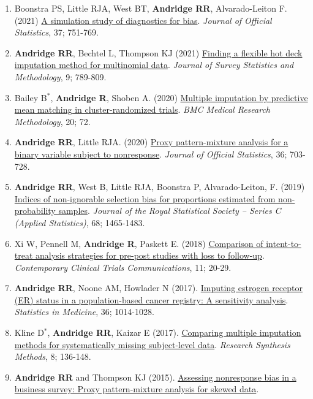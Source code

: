 \documentclass[
  english,
  letterpaper,
  DIV=11,
  numbers=noendperiod]{scrartcl}
\begin{document}
\begin{enumerate}
{  Applied Statistics}, 15; 1556-1581.
\item
  Boonstra PS, Little RJA, West BT, \textbf{Andridge RR},
  Alvarado-Leiton F. (2021)
  \href{https://doi.org/10.2478/jos-2021-0033}{A simulation study of
  diagnostics for bias}. \emph{Journal of Official Statistics}, 37;
  751-769.
\item
  \textbf{Andridge RR}, Bechtel L, Thompson KJ (2021)
  \href{https://doi.org/10.1093/jssam/smaa005}{Finding a flexible hot
  deck imputation method for multinomial data}. \emph{Journal of Survey
  Statistics and Methodology}, 9; 789-809.
\item
  Bailey B\(^*\), \textbf{Andridge R}, Shoben A. (2020)
  \href{https://doi.org/10.1186/s12874-020-00948-6}{Multiple imputation
  by predictive mean matching in cluster-randomized trials}. \emph{BMC
  Medical Research Methodology}, 20; 72.
\item
  \textbf{Andridge RR}, Little RJA. (2020)
  \href{https://doi.org/10.2478/jos-2020-0035}{Proxy pattern-mixture
  analysis for a binary variable subject to nonresponse}. \emph{Journal
  of Official Statistics}, 36; 703-728.
\item
  \textbf{Andridge RR}, West B, Little RJA, Boonstra P, Alvarado-Leiton,
  F. (2019) \href{https://doi.org/10.1111/rssc.12371}{Indices of
  non-ignorable selection bias for proportions estimated from
  non-probability samples}. \emph{Journal of the Royal Statistical
  Society -- Series C (Applied Statistics)}, 68; 1465-1483.
\item
  Xi W, Pennell M, \textbf{Andridge R}, Paskett E. (2018)
  \href{https://doi.org/10.1016/j.conctc.2018.05.008}{Comparison of
  intent-to-treat analysis strategies for pre-post studies with loss to
  follow-up}. \emph{Contemporary Clinical Trials Communications}, 11;
  20-29.
\item
  \textbf{Andridge RR}, Noone AM, Howlader N (2017).
  \href{https://doi.org/10.1002/sim.7193}{Imputing estrogen receptor
  (ER) status in a population-based cancer registry: A sensitivity
  analysis}. \emph{Statistics in Medicine}, 36; 1014-1028.
\item
  Kline D\(^*\), \textbf{Andridge RR}, Kaizar E (2017).
  \href{https://doi.org/10.1002/jrsm.1192}{Comparing multiple imputation
  methods for systematically missing subject-level data}. \emph{Research
  Synthesis Methods}, 8; 136-148.
\item
  \textbf{Andridge RR} and Thompson KJ (2015).
  \href{https://doi.org/10.1214/15-AOAS878}{Assessing nonresponse bias
  in a business survey: Proxy pattern-mixture analysis for skewed data}.

\end{enumerate}
\end{document}
